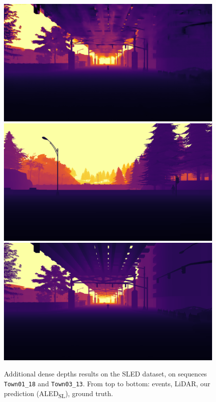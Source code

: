 \begin{figure}
  \includegraphics[width=0.475\linewidth]{mainmatter/figures/b_depth_conv/sled_dense_cmp_additional/prev006552.png}
  \includegraphics[width=0.475\linewidth]{mainmatter/figures/b_depth_conv/sled_dense_cmp_additional/gtprev003720.png}
  \includegraphics[width=0.475\linewidth]{mainmatter/figures/b_depth_conv/sled_dense_cmp_additional/gtprev006552.png}
  \cprotect\caption{Additional dense depths results on the SLED dataset, on sequences \verb|Town01_18| and \verb|Town03_13|. From top to bottom: events, LiDAR, our prediction (ALED\textsubscript{SL}), ground truth.}\label{fig:appendix:aled:sled_cmp_additional_good_2}
\end{figure}

